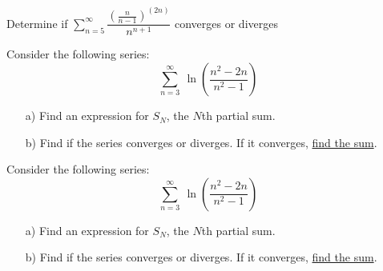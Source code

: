 \documentclass{ximera}
\newcommand{\dsum}{\displaystyle\sum}
\begin{document}
\begin{problem}%
Determine if $\dsum\limits_{n=5}^{\infty} \dfrac{\left( \frac{n}{n-1} \right)^{(2n)}}{n^{n+1}}$ converges or diverges
\begin{multipleChoice}
\end{multipleChoice}
\end{problem}

\begin{question}
Consider the following series:
$$\sum_{n=3}^\infty \ \ln \left ( \frac{n^2-2n}{n^2-1} \right)$$
\begin{enumerate}

\item[a)] Find an expression for $S_N$, the $N$th partial sum.
\begin{freeResponse}
\end{freeResponse}

\vfill

\item[b)] Find if the series converges or diverges. If it converges, \underline{find the sum}.
\begin{freeResponse}
\end{freeResponse}

\vfill

\end{enumerate}
\end{question}

\newpage
\begin{question}
Consider the following series:
$$\sum_{n=3}^\infty \ \ln \left ( \frac{n^2-2n}{n^2-1} \right)$$
\begin{enumerate}

\item[a)] Find an expression for $S_N$, the $N$th partial sum.
\begin{freeResponse}
\end{freeResponse}

\vfill

\item[b)] Find if the series converges or diverges. If it converges, \underline{find the sum}.

\begin{freeResponse}
\end{freeResponse}
\vfill
\end{enumerate}
\end{question}
\end{document}
